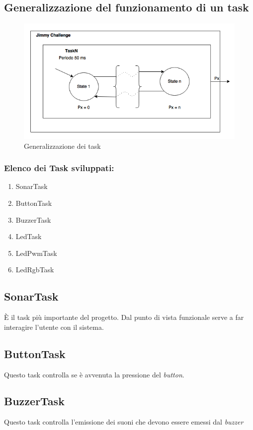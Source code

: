 \subsection{Generalizzazione del funzionamento di un task}
\begin{figure}[!ht]
	\centering
	\includegraphics[scale=.60]{img/task_generic.png}
	\caption{Generalizzazione dei task}
\end{figure}

\subsubsection{Elenco dei Task sviluppati:}
\begin{enumerate}
	\item SonarTask
	\item ButtonTask
	\item BuzzerTask
	\item LedTask
	\item LedPwmTask
	\item LedRgbTask
\end{enumerate}

\subsection{SonarTask}
È il task più importante del progetto. Dal punto di vista funzionale serve a far interagire l'utente con il sistema.

\subsection{ButtonTask}
Questo task controlla se è avvenuta la pressione del \textit{button}.

\subsection{BuzzerTask}
Questo task controlla l'emissione dei suoni che devono essere emessi dal \textit{buzzer}

